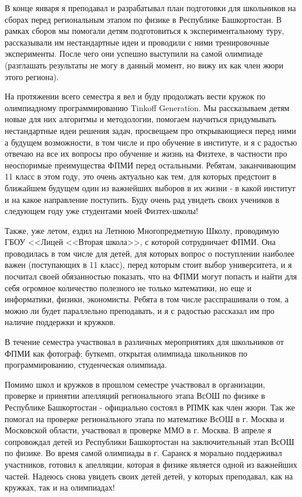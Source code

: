 \quad В конце января я преподавал и разрабатывал план подготовки для школьников на сборах перед региональным этапом по физике в Республике
Башкортостан. В рамках сборов мы помогали детям подготовиться к экспериментальному туру, рассказывали им нестандартные идеи и проводили с ними
тренировочные эксперименты. После чего они успешно выступили на самой олимпиаде (разглашать результаты не могу в данный момент, но вижу их как
член жюри этого региона).

\quad На протяжении всего семестра я вел и буду продолжать вести кружок по олимпиадному программированию Tinkoff Generation. Мы рассказываем
детям новые для них алгоритмы и методологии, помогаем научиться придумывать нестандартные идеи решения задач, просвещаем про открывающиеся
перед ними а будущем возможности, в том числе и про обучение в институте, и я с радостью отвечаю на все их вопросы про обучение и жизнь на
Физтехе, в частности про неоспоримые преимущества ФПМИ перед остальными. Ребятам, заканчивающим 11 класс в этом году, это очень актуально как
тем, для которых предстоит в ближайшем будущем один из важнейших выборов в их жизни ‐ в какой институт и на какое направление поступить. Буду
очень рад увидеть своих учеников в следующем году уже студентами моей Физтех-школы!

\quad Также, уже летом, ездил на Летнюю Многопредметную Школу, проводимую ГБОУ <<Лицей <<Вторая школа>>, с которой сотрудничает ФПМИ. Она
проводилась в том числе для детей, для которых вопрос о поступлении наиболее важен (поступающих в 11 класс), перед которым стоит выбор
университета, и я посчитал своей обязанностью показать, что на ФПМИ могут попасть и найти для себя огромное количество полезного не только
математики, но еще и информатики, физики, экономисты. Ребята в том числе расспрашивали о том, а можно ли будет параллельно преподавать, и я с
радостью рассказал им про наличие поддержки и кружков.

\quad В течение семестра участвовал в различных мероприятиях для школьников от ФПМИ как фотограф: буткемп, открытая олимпиада школьников по 
программированию, студенческая олимпиада.

\quad Помимо школ и кружков в прошлом семестре участвовал в организации, проверке и принятии апелляций регионального этапа ВсОШ по физике в Республике
Башкортостан - официально состоял в РПМК как член жюри. Так же помогал на проверке регионального этапа по математике ВсОШ в
г. Москва и Московской области, участвовал в проверке ММО в г. Москва. В апреле я сопровождал детей из Республики Башкортостан на
заключительный этап ВсОШ по физике. Во время самой олимпиады в г. Саранск я морально поддерживал участников, готовил к апелляции, которая в физике
является одной из важнейших частей. Надеюсь снова увидеть своих детей детей, у которых преподавал, как на кружках, так и на олимпиадах!

